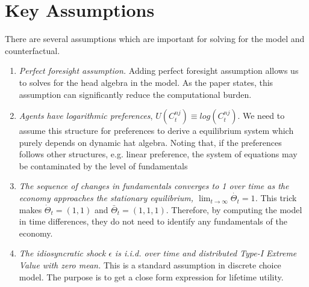 \documentclass{article}
\begin{document}
\section{Key Assumptions}
There are several assumptions which are important for solving for the model and counterfactual. 
\begin{enumerate}
    \item \textit{Perfect foresight assumption. } Adding perfect foresight assumption allows us to solves for the head algebra in the model. As the paper states, this assumption can significantly reduce the computational burden. 
    \item \textit{Agents have logarithmic preferences}, $U(C_t^{nj}) \equiv log(C_t^{nj})$. We need to assume this structure for preferences to derive a equilibrium system which purely depends on dynamic hat algebra. Noting that, if the preferences follows other structures, e.g. linear preference, the system of equations may be contaminated by the level of fundamentals 
    \item \textit{The sequence of changes in fundamentals converges to 1 over time as the economy approaches the stationary equilibrium, $\lim_{t\rightarrow\infty}\dot{\Theta_t} = 1$.} This trick makes $\dot{\Theta}_t = (1, 1)$ and $\bar{\Theta}_t = (1, 1, 1)$. Therefore, by computing the model in time differences, they do not need to identify any fundamentals of the economy.
    \item \textit{The idiosyncratic shock $\epsilon$ is i.i.d. over time and distributed Type-I Extreme Value with zero mean.} This is a standard assumption in discrete choice model. The purpose is to get a close form expression for lifetime utility.
\end{enumerate}
\end{document}
